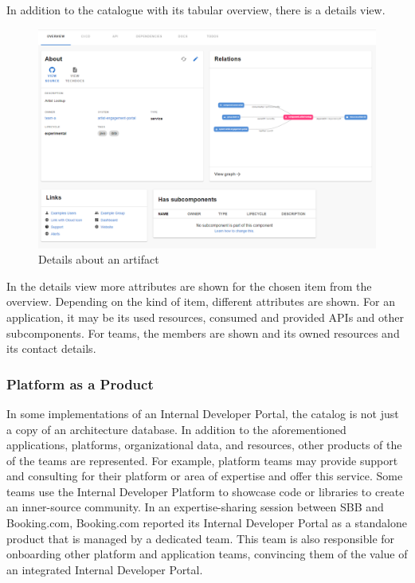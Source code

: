\documentclass[a4paper,12pt]{article}
\begin{document}
    In addition to the catalogue with its tabular overview, there is a details view.
    \begin{figure}
        \includegraphics[width=\linewidth]{backstage_item_details}
        \caption{Details about an artifact}
        \label{fig:portaldetails}
    \end{figure}
    In the details view more attributes are shown for the chosen item from the overview.
    Depending on the kind of item, different attributes are shown.
    For an application, it may be its used resources, consumed and provided APIs and other subcomponents.
    For teams, the members are shown and its owned resources and its contact details.


    \subsubsection{Platform as a Product}
    \label{sssec:paap}
    In some implementations of an Internal Developer Portal, the catalog is not just a copy of an architecture database.
    In addition to the aforementioned applications, platforms, organizational data, and resources, other products of the
    of the teams are represented.
    For example, platform teams may provide support and consulting for their platform or area of expertise and offer this service.
    Some teams use the Internal Developer Platform to showcase code or libraries to create an inner-source community.
    In an expertise-sharing session between SBB and Booking.com, Booking.com reported its Internal Developer Portal as a
    standalone product that is managed by a dedicated team.
    This team is also responsible for onboarding other platform and application teams, convincing them of the
    value of an integrated Internal Developer Portal.
\end{document}
